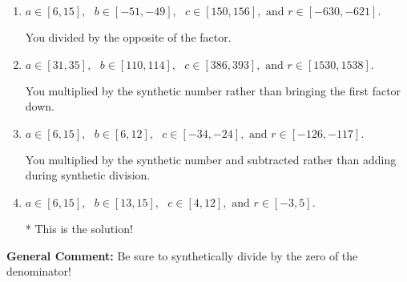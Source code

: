 \documentclass{extbook}[14pt]
\begin{document}
\begin{enumerate}
{\begin{enumerate}[label=\Alph*.]
 You divided by the opposite of the factor AND multiplied the first factor rather than just bringing it down.
\item \( a \in [6, 15], \text{   } b \in [-51, -49], \text{   } c \in [150, 156], \text{   and   } r \in [-630, -621]. \)

 You divided by the opposite of the factor.
\item \( a \in [31, 35], \text{   } b \in [110, 114], \text{   } c \in [386, 393], \text{   and   } r \in [1530, 1538]. \)

 You multiplied by the synthetic number rather than bringing the first factor down.
\item \( a \in [6, 15], \text{   } b \in [6, 12], \text{   } c \in [-34, -24], \text{   and   } r \in [-126, -117]. \)

 You multiplied by the synthetic number and subtracted rather than adding during synthetic division.
\item \( a \in [6, 15], \text{   } b \in [13, 15], \text{   } c \in [4, 12], \text{   and   } r \in [-3, 5]. \)

* This is the solution!
\end{enumerate}

\textbf{General Comment:} Be sure to synthetically divide by the zero of the denominator!
}
\end{enumerate}
\end{document}
